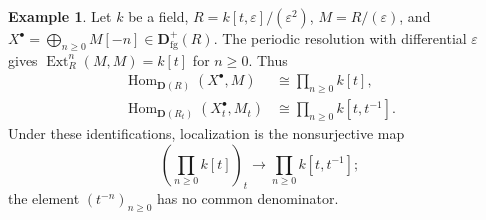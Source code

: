 \documentclass[11pt]{amsart}
\numberwithin{equation}{section}
\theoremstyle{definition}
\newtheorem{example}[theorem]{Example}
\theoremstyle{remark}
\DeclareMathOperator{\Hom}{Hom}
\DeclareMathOperator{\Ext}{Ext}
\newcommand{\D}{\mathbf D}
\newcommand{\fg}{\mathrm{fg}}
\begin{document}
\begin{example}\label{ex:localization-failure}
Let $k$ be a field,
$R=k[t,\varepsilon]/(\varepsilon^2)$, $M=R/(\varepsilon)$, and
$X^{\bullet}=\bigoplus_{n\geq0}M[-n]\in\D^+_{\fg}(R)$. The periodic resolution with
differential $\varepsilon$ gives $\Ext_R^n(M,M)=k[t]$ for $n\geq0$.
Thus
\[
 \begin{aligned}
 \Hom_{\D(R)}(X^{\bullet},M)&\cong\prod_{n\geq0}k[t],\\
 \Hom_{\D(R_t)}(X_t^{\bullet},M_t)&\cong\prod_{n\geq0}k[t,t^{-1}].
 \end{aligned}
\]
Under these identifications, localization is the nonsurjective map
\[
 \left(\prod_{n\geq0}k[t]\right)_t
 \longrightarrow\prod_{n\geq0}k[t,t^{-1}];
\]
the element $(t^{-n})_{n\geq0}$ has no common denominator.
\end{example}
\end{document}
